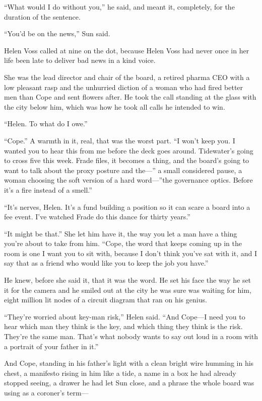 \documentclass[11pt,openany]{book}
\newcommand{\scenebreak}{\par\vspace{0.5\baselineskip}\begin{center}\textasteriskcentered\quad\textasteriskcentered\quad\textasteriskcentered\end{center}\vspace{0.5\baselineskip}\par}
\begin{document}
``What would I do without you,'' he said, and meant it, completely, for the duration of the sentence.

``You'd be on the news,'' Sun said.


\scenebreak


Helen Voss called at nine on the dot, because Helen Voss had never once in her life been late to deliver bad news in a kind voice.

She was the lead director and chair of the board, a retired pharma CEO with a low pleasant rasp and the unhurried diction of a woman who had fired better men than Cope and sent flowers after. He took the call standing at the glass with the city below him, which was how he took all calls he intended to win.

``Helen. To what do I owe.''

``Cope.'' A warmth in it, real, that was the worst part. ``I won't keep you. I wanted you to hear this from me before the deck goes around. Tidewater's going to cross five this week. Frade files, it becomes a thing, and the board's going to want to talk about the proxy posture and the---'' a small considered pause, a woman choosing the soft version of a hard word---''the governance optics. Before it's a fire instead of a smell.''

``It's nerves, Helen. It's a fund building a position so it can scare a board into a fee event. I've watched Frade do this dance for thirty years.''

``It might be that.'' She let him have it, the way you let a man have a thing you're about to take from him. ``Cope, the word that keeps coming up in the room is one I want you to sit with, because I don't think you've sat with it, and I say that as a friend who would like you to keep the job you have.''

He knew, before she said it, that it was the word. He set his face the way he set it for the camera and he smiled out at the city he was sure was waiting for him, eight million lit nodes of a circuit diagram that ran on his genius.

``They're worried about key-man risk,'' Helen said. ``And Cope---I need you to hear which man they think is the key, and which thing they think is the risk. They're the same man. That's what nobody wants to say out loud in a room with a portrait of your father in it.''

And Cope, standing in his father's light with a clean bright wire humming in his chest, a manifesto rising in him like a tide, a name in a box he had already stopped seeing, a drawer he had let Sun close, and a phrase the whole board was using as a coroner's term---
\end{document}
